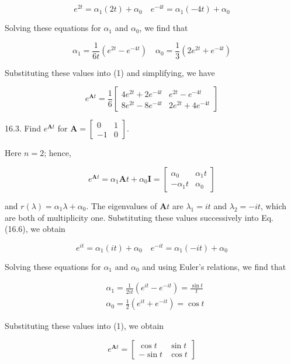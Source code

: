 \documentclass[10pt]{article}
\begin{document}
$$
e^{2 t}=\alpha_{1}(2 t)+\alpha_{0} \quad e^{-4 t}=\alpha_{1}(-4 t)+\alpha_{0}
$$

Solving these equations for $\alpha_{1}$ and $\alpha_{0}$, we find that

$$
\alpha_{1}=\frac{1}{6 t}\left(e^{2 t}-e^{-4 t}\right) \quad \alpha_{0}=\frac{1}{3}\left(2 e^{2 t}+e^{-4 t}\right)
$$

Substituting these values into (1) and simplifying, we have

$$
e^{\mathbf{A} t}=\frac{1}{6}\left[\begin{array}{cc}
4 e^{2 t}+2 e^{-4 t} & e^{2 t}-e^{-4 t} \\
8 e^{2 t}-8 e^{-4 t} & 2 e^{2 t}+4 e^{-4 t}
\end{array}\right]
$$

16.3. Find $e^{\mathbf{A} t}$ for $\mathbf{A}=\left[\begin{array}{rr}0 & 1 \\ -1 & 0\end{array}\right]$.

Here $n=2$; hence,

\[
e^{\mathbf{A} t}=\alpha_{1} \mathbf{A} t+\alpha_{0} \mathbf{I}=\left[\begin{array}{cc}
\alpha_{0} & \alpha_{1} t  \tag{1}\\
-\alpha_{1} t & \alpha_{0}
\end{array}\right]
\]

and $r(\lambda)=\alpha_{1} \lambda+\alpha_{0}$. The eigenvalues of $\mathbf{A} t$ are $\lambda_{1}=i t$ and $\lambda_{2}=-i t$, which are both of multiplicity one. Substituting these values successively into Eq. (16.6), we obtain

$$
e^{i t}=\alpha_{1}(i t)+\alpha_{0} \quad e^{-i t}=\alpha_{1}(-i t)+\alpha_{0}
$$

Solving these equations for $\alpha_{1}$ and $\alpha_{0}$ and using Euler's relations, we find that

$$
\begin{aligned}
& \alpha_{1}=\frac{1}{2 i t}\left(e^{i t}-e^{-i t}\right)=\frac{\sin t}{t} \\
& \alpha_{0}=\frac{1}{2}\left(e^{i t}+e^{-i t}\right)=\cos t
\end{aligned}
$$

Substituting these values into (1), we obtain

$$
e^{\mathbf{A} t}=\left[\begin{array}{cc}
\cos t & \sin t \\
-\sin t & \cos t
\end{array}\right]
$$
\end{document}
